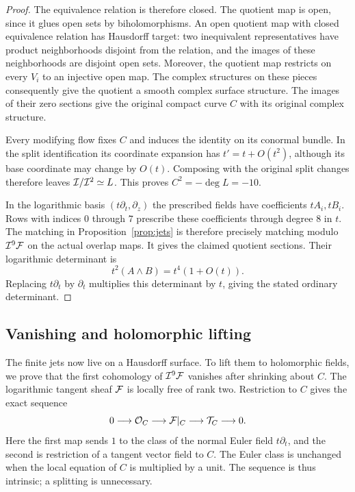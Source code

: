 \begin{proof}
The equivalence relation is therefore closed.  The quotient map is
open, since it glues open sets by biholomorphisms.  An open quotient
map with closed equivalence relation has Hausdorff target: two
inequivalent representatives have product neighborhoods disjoint
from the relation, and the images of these neighborhoods are
disjoint open sets.  Moreover, the quotient map restricts on every
$V_i$ to an injective open map.  The complex structures on these
pieces consequently give the quotient a smooth complex surface
structure.  The images of their zero sections give the original
compact curve $C$ with its original complex structure.

Every modifying flow fixes $C$ and induces the identity on its
conormal bundle.  In the split identification its coordinate
expansion has $t'=t+O(t^2)$, although its base coordinate may change
by $O(t)$.  Composing with the original split changes therefore
leaves $\mathcal I/\mathcal I^2\simeq L$.  This proves $C^2=-\deg L=-10$.

In the logarithmic basis $(t\partial_t,\partial_z)$ the prescribed
fields have coefficients $tA_i,tB_i$.  Rows with indices $0$ through
$7$ prescribe these coefficients through degree $8$ in $t$.
The matching in Proposition~\ref{prop:jets} is therefore precisely
matching modulo $\mathcal I^9\mathcal F$ on the actual overlap maps.  It gives the
claimed quotient sections.  Their logarithmic determinant is
\[
 t^2(A\wedge B)=t^4(1+O(t)).
\]
Replacing $t\partial_t$ by $\partial_t$ multiplies this determinant
by $t$, giving the stated ordinary determinant.
\end{proof}



\subsection{Vanishing and holomorphic lifting}

The finite jets now live on a Hausdorff surface. To lift them to
holomorphic fields, we prove that the first cohomology of
$\mathcal I^9\mathcal F$ vanishes after shrinking about $C$.
The logarithmic tangent sheaf $\mathcal F$ is locally free of rank two.
Restriction to $C$ gives the exact sequence
\begin{equation}\label{analytic:log-sequence}
 0\longrightarrow\mathcal O_C\longrightarrow\mathcal F|_C
 \longrightarrow\mathcal T_C\longrightarrow0.
\end{equation}
Here the first map sends $1$ to the class of the normal Euler field
$t\partial_t$, and the second is restriction of a tangent vector
field to $C$.  The Euler class is unchanged when the local equation
of $C$ is multiplied by a unit.  The sequence is thus intrinsic; a
splitting is unnecessary.

